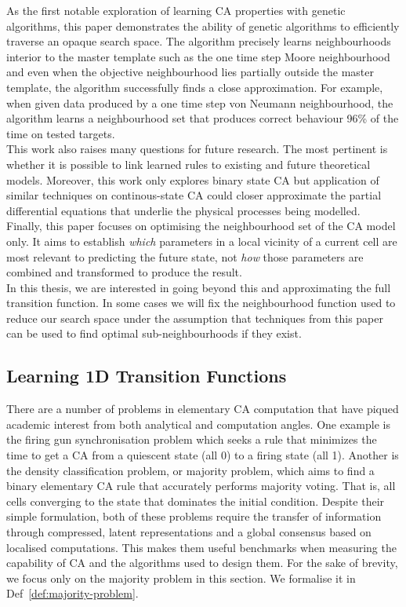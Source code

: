 As the first notable exploration of learning CA properties with genetic algorithms, this paper demonstrates the ability of genetic algorithms to efficiently traverse an opaque search space. The algorithm precisely learns neighbourhoods interior to the master template such as the one time step Moore neighbourhood and even when the objective neighbourhood lies partially outside the master template, the algorithm successfully finds a close approximation. For example, when given data produced by a one time step von Neumann neighbourhood, the algorithm learns a neighbourhood set that produces correct behaviour 96\% of the time on tested targets.\\

This work also raises many questions for future research. The most pertinent is whether it is possible to link learned rules to existing and future theoretical models. Moreover, this work only explores binary state CA but application of similar techniques on continous-state CA could closer approximate the partial differential equations that underlie the physical processes being modelled.\\

Finally, this paper focuses on optimising the neighbourhood set of the CA model only. It aims to establish \textit{which} parameters in a local vicinity of a current cell are most relevant to predicting the future state, not \textit{how} those parameters are combined and transformed to produce the result.\\ In this thesis, we are interested in going beyond this and approximating the full transition function. In some cases we will fix the neighbourhood function used to reduce our search space under the assumption that techniques from this paper can be used to find optimal sub-neighbourhoods if they exist.\\


\subsection{Learning 1D Transition Functions}

There are a number of problems in elementary CA computation that have piqued academic interest from both analytical and computation angles. One example is the firing gun synchronisation problem\cite{moore1964firing} which seeks a rule that minimizes the time to get a CA from a quiescent state (all 0) to a firing state (all 1). Another is the density classification problem, or majority problem, which aims to find a binary elementary CA rule that accurately performs majority voting. That is, all cells converging to the state that dominates the initial condition. Despite their simple formulation, both of these problems require the transfer of information through compressed, latent representations and a global consensus based on localised computations. This makes them useful benchmarks when measuring the capability of CA and the algorithms used to design them. For the sake of brevity, we focus only on the majority problem in this section. We formalise it in Def~\ref{def:majority-problem}.

